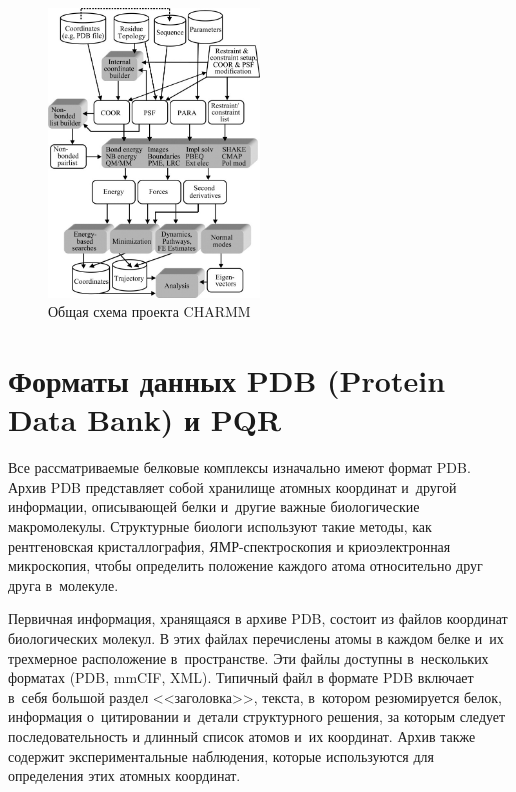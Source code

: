 \begin{figure}[h!]
\begin{center}
	\includegraphics[width=0.5\textwidth]{images/charmm.jpg}
	\caption{Общая схема проекта CHARMM}
    \label{charmm}
\end{center}
\end{figure}




\section{Форматы данных PDB (Protein Data Bank) и PQR}

Все рассматриваемые белковые комплексы изначально имеют формат PDB. Архив PDB представляет собой хранилище атомных координат и~другой информации, описывающей белки и~другие важные биологические макромолекулы. Структурные биологи используют такие методы, как рентгеновская кристаллография, ЯМР-спектроскопия и криоэлектронная микроскопия, чтобы определить положение каждого атома относительно друг друга в~молекуле. 

Первичная информация, хранящаяся в архиве PDB, состоит из файлов координат биологических молекул. В этих файлах перечислены атомы в каждом белке и~их трехмерное расположение в~пространстве. Эти файлы доступны в~нескольких форматах (PDB, mmCIF, XML). Типичный файл в формате PDB включает в~себя большой раздел <<заголовка>>, текста, в~котором резюмируется белок, информация о~цитировании и~детали структурного решения, за которым следует последовательность и длинный список атомов и~их координат. Архив также содержит экспериментальные наблюдения, которые используются для определения этих атомных координат.

